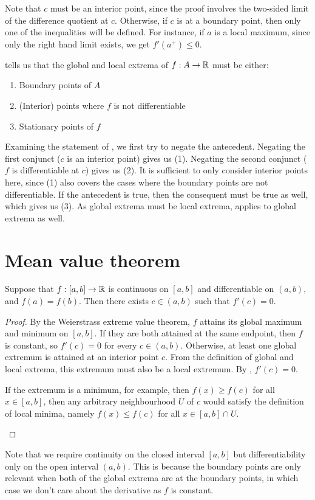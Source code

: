 \begin{remark}
  Note that $c$ must be an interior point, since the proof involves the two-sided limit of the difference quotient at $c$. Otherwise, if $c$ is at a boundary point, then only one of the inequalities will be defined. For instance, if $a$ is a local maximum, since only the right hand limit exists, we get $f'(a ^ +) \leq 0$.
\end{remark}
 tells us that the global and local extrema of $f: A \to \mathbb{R}$ must be either:
\begin{enumerate}[(1)]
  \item Boundary points of $A$
  \item (Interior) points where $f$ is not differentiable
  \item Stationary points of $f$
\end{enumerate}
Examining the statement of , we first try to negate the antecedent. Negating the first conjunct ($c$ is an interior point) gives us (1). Negating the second conjunct ($f$ is differentiable at $c$) gives us (2). It is sufficient to only consider interior points here, since (1) also covers the cases where the boundary points are not differentiable. If the antecedent is true, then the consequent must be true as well, which gives us (3). As global extrema must be local extrema,  applies to global extrema as well.


\section{Mean value theorem}
\begin{theorem}
  \label{thm:rolle}
  Suppose that $f: [a, b] \to \mathbb{R}$ is continuous on $[a, b]$ and differentiable on $(a, b)$, and $f(a) = f(b)$. Then there exists $c \in (a, b)$ such that $f'(c) = 0$.
\end{theorem}
\begin{proof}
  By the Weierstrass extreme value theorem, $f$ attains its global maximum and minimum on $[a, b]$. If they are both attained at the same endpoint, then $f$ is constant, so $f'(c) = 0$ for every $c \in (a, b)$. Otherwise, at least one global extremum is attained at an interior point $c$. From the definition of global and local extrema, this extremum must also be a local extremum. By , $f'(c) = 0$.
  \begin{remark}
    If the extremum is a minimum, for example, then $f(x) \geq f(c)$ for all $x \in [a, b]$, then any arbitrary neighbourhood $U$ of $c$ would satisfy the definition of local minima, namely $f(x) \leq f(c)$ for all $x \in [a, b] \cap U$. 
  \end{remark}
\end{proof}
Note that we require continuity on the closed interval $[a, b]$ but differentiability only on the open interval $(a, b)$. This is because the boundary points are only relevant when both of the global extrema are at the boundary points, in which case we don't care about the derivative as $f$ is constant.

